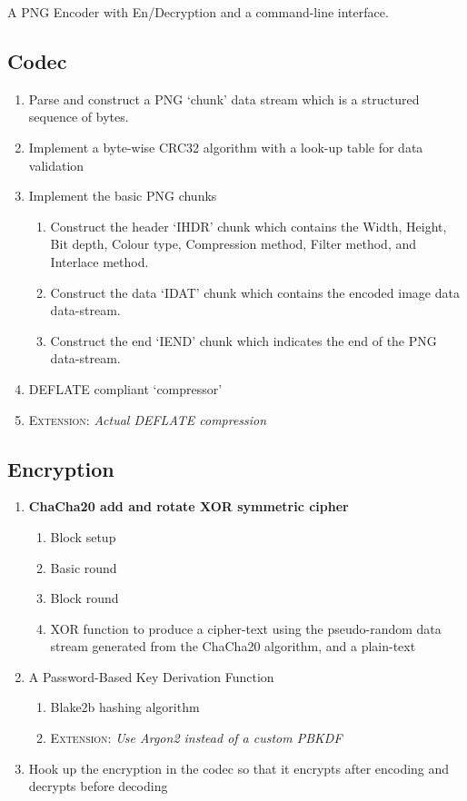\documentclass{report}
\begin{document}
A PNG Encoder with En/Decryption and a command-line interface.

\subsection{Codec}
\begin{enumerate}
    \item Parse and construct a PNG `chunk' data stream which is a structured sequence of bytes.
    \item Implement a byte-wise CRC32 algorithm \cite{crc32} with a look-up table for data validation
    \item Implement the basic PNG chunks
    \begin{enumerate}
        \item Construct the header `IHDR' chunk which contains the Width, Height, Bit depth, Colour type, Compression method, Filter method, and Interlace method.
        \item Construct the data `IDAT' chunk which contains the encoded image data data-stream.
        \item Construct the end `IEND' chunk which indicates the end of the PNG data-stream.
    \end{enumerate}
    \item DEFLATE\cite{deflate} compliant `compressor'
    \item \textsc{Extension:} \textit{Actual DEFLATE compression}
\end{enumerate}

\subsection{Encryption}
\begin{enumerate}
    \item \textbf{ChaCha20 add and rotate XOR symmetric cipher}
    \begin{enumerate}
        \item Block setup
        \item Basic round
        \item Block round
        \item XOR function to produce a cipher-text using the pseudo-random data stream generated from the ChaCha20 algorithm, and a plain-text
    \end{enumerate}
    \item A Password-Based Key Derivation Function
    \begin{enumerate}        
        \item Blake2b hashing algorithm
        \item \textsc{Extension:} \textit{Use Argon2 instead of a custom PBKDF}
    \end{enumerate}
    \item Hook up the encryption in the codec so that it encrypts after encoding and decrypts before decoding
\end{enumerate}
\end{document}
